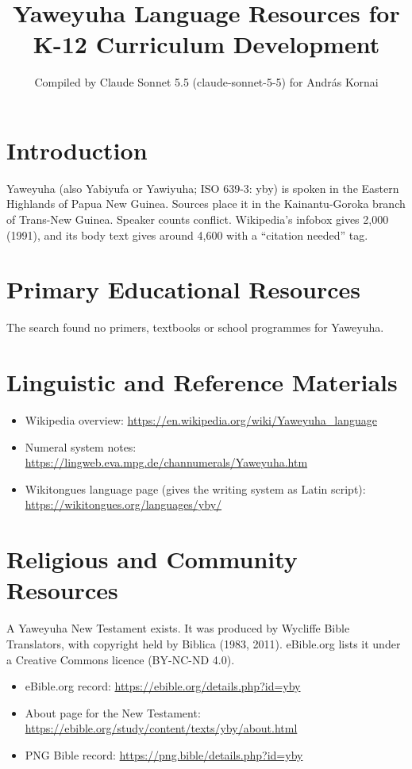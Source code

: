 \documentclass[12pt]{article}
\title{Yaweyuha Language Resources for K-12 Curriculum Development}
\author{Compiled by Claude Sonnet 5.5 (claude-sonnet-5-5) for Andr\'as Kornai}
\date{}
\begin{document}
\maketitle

\section{Introduction}
Yaweyuha (also Yabiyufa or Yawiyuha; ISO 639-3: yby) is spoken in the Eastern Highlands of Papua New Guinea. Sources place it in the Kainantu-Goroka branch of Trans-New Guinea. Speaker counts conflict. Wikipedia's infobox gives 2,000 (1991), and its body text gives around 4,600 with a ``citation needed'' tag.

\section{Primary Educational Resources}
The search found no primers, textbooks or school programmes for Yaweyuha.

\section{Linguistic and Reference Materials}
\begin{itemize}
\item Wikipedia overview: \url{https://en.wikipedia.org/wiki/Yaweyuha_language}
\item Numeral system notes: \url{https://lingweb.eva.mpg.de/channumerals/Yaweyuha.htm}
\item Wikitongues language page (gives the writing system as Latin script): \url{https://wikitongues.org/languages/yby/}
\end{itemize}

\section{Religious and Community Resources}
A Yaweyuha New Testament exists. It was produced by Wycliffe Bible Translators, with copyright held by Biblica (1983, 2011). eBible.org lists it under a Creative Commons licence (BY-NC-ND 4.0).
\begin{itemize}
\item eBible.org record: \url{https://ebible.org/details.php?id=yby}
\item About page for the New Testament: \url{https://ebible.org/study/content/texts/yby/about.html}
\item PNG Bible record: \url{https://png.bible/details.php?id=yby}
\end{itemize}
\end{document}
